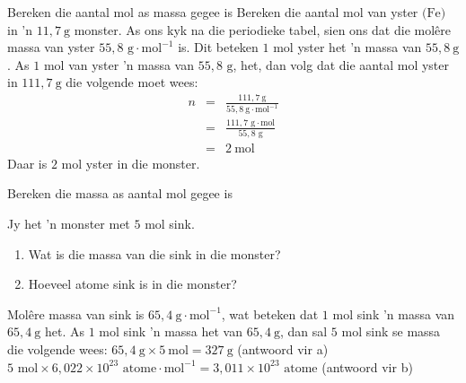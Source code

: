       \begin{wex}{Bereken die aantal mol as massa gegee is}{
      \label{m38717*id276776} Bereken die aantal mol van yster $\text{(Fe)}$ in 'n $11,7 ~\text{g}$ monster.  }
{
As ons kyk na die periodieke tabel, sien ons dat die molêre massa van yster $55,8 \text{ g} \cdot \text{mol}^{-1}$ is. Dit beteken $1$ mol yster het 'n massa van $55,8 ~\text{g}$.
      \label{m38717*id276848}As $1$ mol van yster 'n massa van $55,8 \text{ g}$, het, dan volg dat die aantal mol yster in $111,7 ~\text{g}$  die volgende moet wees: 
\begin{eqnarray*}
n & = & \frac{111,7 ~\text{g}}{55,8 ~\text{g} \cdot{\text{mol}}^{-1}} \\
 & = & \frac{111,7 \text{ g} \cdot \text{mol}}{55,8 \text{ g}} \\
 & = & 2 ~\text{mol}
\end{eqnarray*}
Daar is $2$ mol yster in die monster.
}
    \end{wex}

      \begin{wex}{Bereken die massa as aantal mol gegee is }{
      \label{m38717*id276928}Jy het 'n monster met $5$ mol sink.
      \label{m38717*id276934}\begin{enumerate}[noitemsep, label=\textbf{\alph*}. ] 
            \label{m38717*uid12}\item Wat is die massa van die sink in die monster?
\label{m38717*uid13}\item Hoeveel atome sink is in die monster?
\end{enumerate}
}
{
      \label{m38717*id276984} Mol\^{e}re massa van sink is $65,4 ~\text{g} \cdot \text{mol}^{-1}$, wat beteken dat $1$ mol sink 'n massa van $65,4 ~\text{g}$ het.
      \label{m38717*id277021}As $1$ mol sink 'n massa het van $65,4 ~\text{g}$, dan sal $5$ mol sink se massa die volgende wees: $65,4 ~\text{g} \times 5 ~\text{mol}=327 ~\text{g}$ (antwoord vir a) 
$5 \text{ mol} \times 6,022 \times {10}^{23} \text{ atome} \cdot \text{mol}^{-1} = 3,011 \times {10}^{23} \text{ atome}$
      \label{m38717*id277263}(antwoord vir b)
}
    \end{wex}
            

